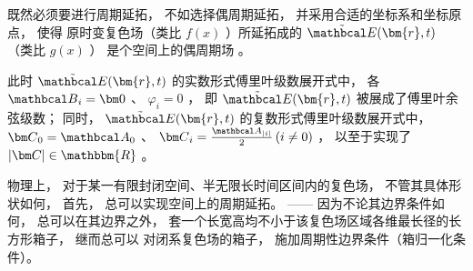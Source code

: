 既然必须要进行周期延拓， 不如选择偶周期延拓， 并采用合适的坐标系和坐标原点， 使得
原时变复色场（类比 $ f(x) $ ）所延拓成的 $ \tilde {{\mathbcal E}}(\bm{r},t) $ （类比 $ g(x) $ ）
是个空间上的偶周期场
。

此时 $ \tilde {{\mathbcal E}}(\bm{r},t) $ 的实数形式傅里叶级数展开式中， 各 $ {\mathbcal B}_i = {\bm 0} $ 、 $ \varphi_i = 0 $ ， 
即 $ \tilde {{\mathbcal E}}(\bm{r},t) $ 被展成了傅里叶余弦级数； 同时， $ \tilde {{\mathbcal E}}(\bm{r},t) $ 
的复数形式傅里叶级数展开式中， 
$ {\bm C}_0 = {\mathbcal A}_0 $ 、 $ {\bm C}_i = \frac{{\mathbcal A}_{\left| i \right|}}{2} \left( {i \ne 0} \right) $ 
， 以至于实现了 $ \left| {\bm C} \right| \in \mathbbm{R} $ 。

物理上， 对于某一有限封闭空间、半无限长时间区间内的复色场， 不管其具体形状如何， 首先， 总可以实现空间上的周期延拓。 
—— 因为不论其边界条件如何， 总可以在其边界之外， 套一个长宽高均不小于该复色场区域各维最长径的长方形箱子， 
继而总可以
对闭系复色场的箱子， 施加周期性边界条件（箱归一化条件）。 


